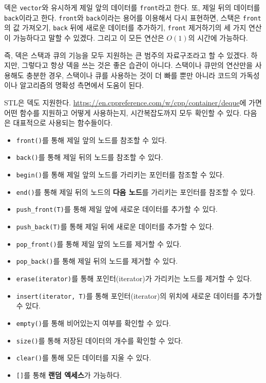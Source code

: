 덱은 \texttt{vector}와 유시하게 제일 앞의 데이터를 \texttt{front}라고 한다. 또, 제일 뒤의 데이터를 \texttt{back}이라고 한다. \texttt{front}와 \texttt{back}이라는 용어를 이용해서 다시 표현하면, 스택은 \texttt{front}의 값 가져오기, \texttt{back} 뒤에 새로운 데이터를 추가하기, \texttt{front} 제거하기의 세 가지 연산이 가능하다고 말할 수 있겠다. 그리고 이 모든 연산은 $O(1)$의 시간에 가능하다.

즉, 덱은 스택과 큐의 기능을 모두 지원하는 큰 범주의 자료구조라고 할 수 있겠다. 하지만, 그렇다고 항상 덱을 쓰는 것은 좋은 습관이 아니다. 스택이나 큐만의 연산만을 사용해도 충분한 경우, 스택이나 큐를 사용하는 것이 더 빠를 뿐만 아니라 코드의 가독성이나 알고리즘의 명확성 측면에서 도움이 된다.

STL은 덱도 지원한다. \url{https://en.cppreference.com/w/cpp/container/deque}에 가면 어떤 함수를 지원하고 어떻게 사용하는지, 시간복잡도까지 모두 확인할 수 있다. 다음은 대표적으로 사용되는 함수들이다.

\begin{itemize}
    \item \texttt{front()}를 통해 제일 앞의 노드를 참조할 수 있다.
    \item \texttt{back()}를 통해 제일 뒤의 노드를 참조할 수 있다.
    \item \texttt{begin()}를 통해 제일 앞의 노드를 가리키는 포인터를 참조할 수 있다.
    \item \texttt{end()}를 통해 제일 뒤의 노드의 \textbf{다음 노드}를 가리키는 포인터를 참조할 수 있다.
    \item \texttt{push\_front(T)}를 통해 제일 앞에 새로운 데이터를 추가할 수 있다.
    \item \texttt{push\_back(T)}를 통해 제일 뒤에 새로운 데이터를 추가할 수 있다.
    \item \texttt{pop\_front()}를 통해 제일 앞의 노드를 제거할 수 있다.
    \item \texttt{pop\_back()}를 통해 제일 뒤의 노드를 제거할 수 있다.
    \item \texttt{erase(iterator)}를 통해 포인터(iterator)가 가리키는 노드를 제거할 수 있다.
    \item \texttt{insert(iterator, T)}를 통해 포인터(iterator)의 위치에 새로운 데이터를 추가할 수 있다.
    \item \texttt{empty()}를 통해 비어있는지 여부를 확인할 수 있다.
    \item \texttt{size()}를 통해 저장된 데이터의 개수를 확인할 수 있다.
    \item \texttt{clear()}를 통해 모든 데이터를 지울 수 있다.
    \item \texttt{[]}를 통해 \textbf{랜덤 엑세스}가 가능하다.
\end{itemize}

